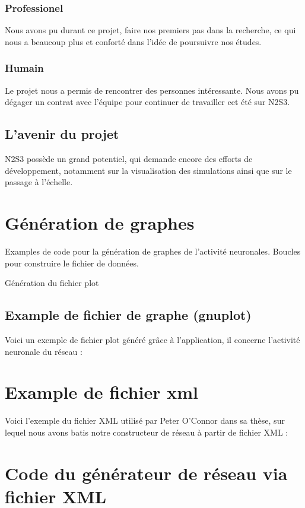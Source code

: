 \documentclass[a4paper,10pt]{article}
\begin{document}
\subsubsection*{Professionel}
Nous avons pu durant ce projet, faire nos premiers pas dans la recherche, ce qui nous a beaucoup plus et conforté dans l'idée de poursuivre nos études.
\subsubsection*{Humain}
Le projet nous a permis de rencontrer des personnes intéressante. Nous avons pu dégager un contrat avec l'équipe pour continuer de travailler cet été sur N2S3.

\subsection*{L'avenir du projet}
N2S3 possède un grand potentiel, qui demande encore des efforts de développement, notamment sur la visualisation des simulations ainsi que sur le passage à l'échelle.

\newpage

\appendix
\section{Génération de graphes}
Examples de code pour la génération de graphes de l'activité neuronales.
\label{gen_graph}
Boucles pour construire le fichier de données.

Génération du fichier plot

\subsection{Example de fichier de graphe (gnuplot)}
Voici un exemple de fichier plot généré grâce à l'application, il concerne l'activité neuronale du réseau : 


\section{Example de fichier xml}
\label{xml_exemple}

Voici l'exemple du fichier XML utilisé par Peter O'Connor dans sa thèse, sur lequel nous avons batis notre constructeur de réseau à partir de fichier XML :
 


\section{Code du générateur de réseau via fichier XML}
\label{xml_builder}

\end{document}
